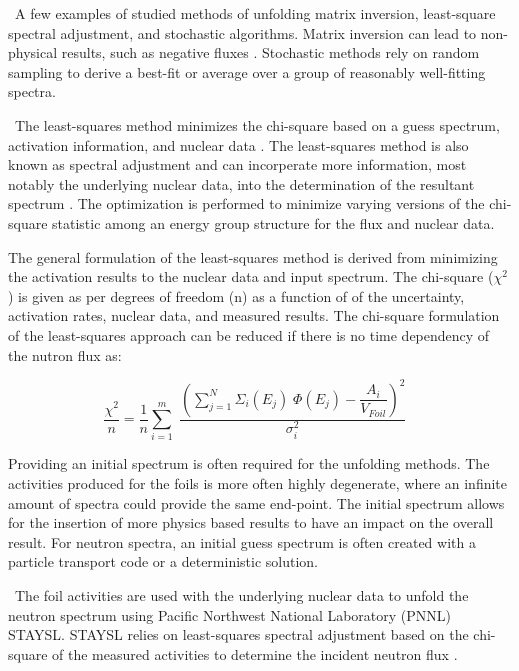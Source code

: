 \documentclass[journal]{IEEEtran}
\begin{document}
	\ A few examples of studied methods of unfolding matrix inversion, least-square spectral adjustment, and stochastic algorithms\cite{Reginatto2010}. 
Matrix inversion can lead to non-physical results, such as negative fluxes \cite{Reginatto2010}. 
Stochastic methods rely on random sampling to derive a best-fit or average over a group of reasonably well-fitting spectra\cite{Reginatto2010}. 
	
	\ The least-squares method minimizes the chi-square based on a guess spectrum, activation information, and nuclear data \cite{Perey1977}. 
The least-squares method is also known as spectral adjustment and can incorperate more information, most notably the underlying nuclear data, into the determination of the resultant spectrum \cite{Perey1977}.
The optimization is performed to minimize varying versions of the chi-square statistic among an energy group structure for the flux and nuclear data. 
	
	The general formulation of the least-squares method is derived from minimizing the activation results to the nuclear data and input spectrum\cite{Perey1977}. 
The chi-square ($\chi^{2}$) is given as per degrees of freedom (n) as a function of of the uncertainty, activation rates, nuclear data, and measured results. 
The chi-square formulation of the least-squares approach can be reduced if there is no time dependency of the nutron flux as:
	
	\begin{equation} \label{eq:LeastSq}
	\dfrac{\chi^2}{n}= \dfrac{1}{n}\sum_{i=1}^{m} \; \dfrac{(\sum_{j=1}^{N} \Sigma_{i}(E_{j}) \;\Phi(E_{j})-\dfrac{A_{i}}{V_{Foil}})^{2}}{\sigma_{i}^{2}} \,\;\; 
	\end{equation}
	
	Providing an initial spectrum is often required for the unfolding methods. 
The activities produced for the foils is more often highly degenerate, where an infinite amount of spectra could provide the same end-point. 
The initial spectrum allows for the insertion of more physics based results to have an impact on the overall result. 
For neutron spectra, an initial guess spectrum is often created with a particle transport code or a deterministic solution. 

	\ The foil activities are used with the underlying nuclear data to unfold the neutron spectrum using Pacific Northwest National Laboratory (PNNL) STAYSL. 
STAYSL relies on least-squares spectral adjustment based on the chi-square of the measured activities to determine the incident neutron flux \cite{Greenwood2016}. 
	
\end{document}
